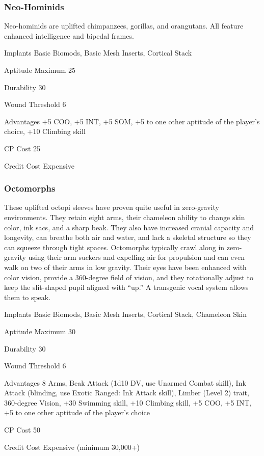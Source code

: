 \subsubsection{Neo-Hominids} \label{sec:starting-neo-hominids} 

Neo-hominids are uplifted chimpanzees, gorillas, and orangutans. All feature enhanced intelligence and bipedal frames. 

\begin{description*} \item[Implants] Basic Biomods, Basic Mesh Inserts, Cortical Stack \item[Aptitude Maximum] 25 \item[Durability] 30 \item[Wound Threshold] 6 \item[Advantages] +5 COO, +5 INT, +5 SOM, +5 to one other aptitude of the player’s choice, +10 Climbing skill \item[CP Cost] 25 \item[Credit Cost] Expensive \end{description*} 

\subsubsection{Octomorphs} \label{sec:starting-octomorphs} 

These uplifted octopi sleeves have proven quite useful in zero-gravity environments. They retain eight arms, their chameleon ability to change skin color, ink sacs, and a sharp beak. They also have increased cranial capacity and longevity, can breathe both air and water, and lack a skeletal structure so they can squeeze through tight spaces. Octomorphs typically crawl along in zero-gravity using their arm suckers and expelling air for propulsion and can even walk on two of their arms in low gravity. Their eyes have been enhanced with color vision, provide a 360-degree field of vision, and they rotationally adjust to keep the slit-shaped pupil aligned with “up.” A transgenic vocal system allows them to speak. 

\begin{description*} \item[Implants] Basic Biomods, Basic Mesh Inserts, Cortical Stack, Chameleon Skin \item[Aptitude Maximum] 30 \item[Durability] 30 \item[Wound Threshold] 6 \item[Advantages] 8 Arms, Beak Attack (1d10 DV, use Unarmed Combat skill), Ink Attack (blinding, use Exotic Ranged: Ink Attack skill), Limber (Level 2) trait, 360-degree Vision, +30 Swimming skill, +10 Climbing skill, +5 COO, +5 INT, +5 to one other aptitude of the player’s choice \item[CP Cost] 50 \item[Credit Cost] Expensive (minimum 30,000+) \end{description*} 

